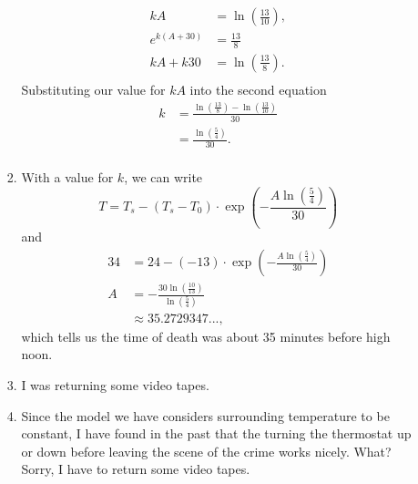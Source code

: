 \documentclass[10pt]{article}
\begin{document}
\begin{enumerate}
\begin{enumerate}
\begin{enumerate}
\begin{align*}
                        kA &= \ln\left(\tfrac{13}{10}\right), \\
                        e^{k(A+30)} &= \frac{13}{8} \\
                        kA+k30 &= \ln\left(\tfrac{13}{8}\right). \\
                    \end{align*}
                    Substituting our value for $kA$ into the second equation
                    \begin{align*}
                        k &= \frac{\ln\left(\tfrac{13}{8}\right) - \ln\left(\tfrac{13}{10}\right)}{30} \\
                        &= \frac{\ln\left(\tfrac{5}{4}\right)}{30}. \\
                    \end{align*}
                \item With a value for $k$, we can write
                        $$T = T_s - (T_s - T_0)\cdot\exp{\left(-\frac{A\ln\left(\tfrac{5}{4}\right)}{30}\right)}$$
                    and
                    \begin{align*}
                        34 &= 24 - (-13)\cdot\exp{\left(-\frac{A\ln\left(\tfrac{5}{4}\right)}{30}\right)} \\
                        A &= -\frac{30\ln\left(\tfrac{10}{13}\right)}{\ln\left(\tfrac{5}{4}\right)} \\
                        &\approx 35.2729347...,
                    \end{align*}
                    which tells us the time of death was about 35 minutes before
                    high noon.
                \item I was returning some video tapes.
                \item Since the model we have considers surrounding temperature
                    to be constant, I have found in the past that the turning
                        the thermostat up or down before leaving the scene of
                        the crime works nicely. What? Sorry, I have to return
                        some video tapes.
             \end{enumerate}
        \end{enumerate}
    \end{enumerate}
\end{document}

